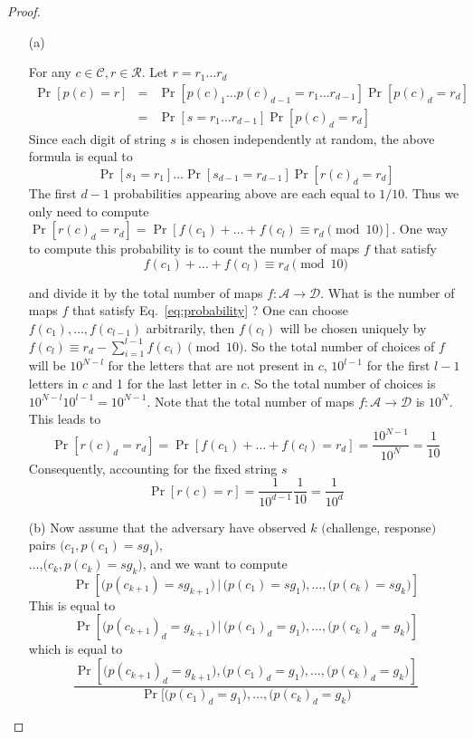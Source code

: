 \documentclass{article}
\begin{document}
\begin{proof}

\begin{itemize}
	\item[(a)]

 For any $c\in\mathcal{C}, r\in\mathcal{R}$. Let $r=r_1\ldots r_d$
	$$
	\begin{array}{lcl}
		\Pr[p(c)=r] & = &
		\Pr[p(c)_1\ldots p(c)_{d-1}=r_1\ldots r_{d-1}]\Pr[p(c)_d=r_d] \\
		& =&
	 \Pr[s=r_1\ldots r_{d-1}]\Pr[p(c)_d=r_d]
	\end{array}
	$$
	Since each digit of string $s$ is chosen independently at random, the above formula is equal to
	$$
	\Pr[s_1=r_1]\ldots \Pr[s_{d-1}=r_{d-1}]\Pr[r(c)_d=r_d]
	$$
	 The first $d-1$ probabilities appearing above are each equal to $1/10$. Thus we only need to compute $\Pr[r(c)_d=r_d]= 
	        \Pr[f(c_1)+\ldots+f(c_{l})\equiv r_d \pmod{10} ]$. One way to compute this probability is to count the number of maps $f$ that satisfy 
	\begin{equation}
		\label{eq:probability}
	        f(c_1)+\ldots+f(c_{l})\equiv r_d \pmod{10}	
	    \end{equation}

	  and divide it by the total number of maps $f:\mathcal{A}\to \mathcal{D}$. What is the number of maps $f$ that satisfy Eq.~\ref{eq:probability} ? One can choose $f(c_1),\ldots ,f(c_{l-1})$ arbitrarily, then $f(c_l)$ will be chosen uniquely by $f(c_l)\equiv r_d-\sum_{i=1}^{l-1}f(c_i)\pmod{10}$. So the total number of choices of $f$ will be $10^{N-{l}}$ for the letters that are not present in $c$, $10^{{l-1}}$ for the first $l-1$ letters in $c$ and 1 for the last letter in $c$. So the total number of choices is $10^{N-l}10^{l-1}=10^{N-1}$. Note that the total number of maps $f:\mathcal{A}\to \mathcal{D}$ is $10^{N}$. This leads to
	$$
	\Pr[r(c)_d=r_d]=\Pr[f(c_1)+\ldots+f(c_l)=r_d]=\dfrac{10^{N-1}}{10^{N}}=\frac{1}{10}
	$$
	Consequently, accounting for the fixed string $s$
	$$
	\Pr[r(c)=r]=\frac{1}{10^{d-1}}\frac{1}{10}=\frac{1}{10^d}
	$$
	
\item[(b)]
	Now assume that the adversary have observed $k$ $($challenge, response$)$ pairs 
	$\big(c_1, p(c_1)=s g_1\big)$,\\$\ldots$,$\big(c_k, p(c_k)=s g_k\big)$, and we want to compute
	$$
	\Pr[\big(p(c_{k+1})=s g_{k+1}\big) \, | \, \big(p(c_1)=s g_1\big),\ldots, \big(p(c_k)=s g_k\big)]
	$$
	This is equal to
	$$
	 \Pr[\big(p(c_{k+1})_d=g_{k+1}\big)\, | \, \big(p(c_1)_d=g_1\big),\ldots, \big(p(c_k)_d=g_k\big)]
	 $$
	 which is equal to 
	 \begin{equation}
	 \label{eq:probability}
	 \frac{\Pr[\big(p(c_{k+1})_d=g_{k+1}\big), \big(p(c_1)_d=g_1\big),\ldots, \big(p(c_k)_d=g_k\big)]}{\Pr[\big(p(c_1)_d=g_1\big),\ldots, \big(p(c_k)_d=g_k\big)}	
	 \end{equation}
	 

\end{itemize}
\end{proof}
\end{document}
